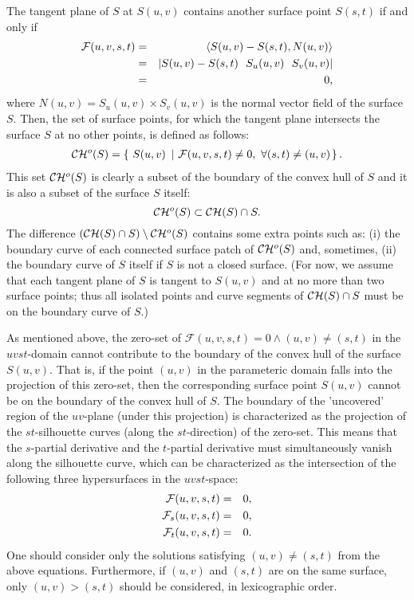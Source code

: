 \documentclass[doublespacing]{elsart}
\begin{document}
The tangent plane of $S$ at $S(u,v)$ contains
another surface point $S(s,t)$ if and only if 
\begin{eqnarray*}
   {\mathcal F}(u,v,s,t) &=& \inner{S(u,v)-S(s,t)}{N(u,v)}\\
   &=& |S(u,v)-S(s,t)\ \ S_u(u,v)\ \ S_v(u,v)|\\
   &=& 0,
\end{eqnarray*}
where $N(u,v) = S_u(u,v) \times S_v(u,v)$ is the normal vector field 
of the surface $S$. Then, the set of surface points, for which 
the tangent plane intersects the surface $S$ at no other points, 
is defined as follows:
\begin{eqnarray*}
\CH{}^o(S) = \left\{~S(u,v)~\left|~ 
{\cal F}(u,v,s,t) \neq 0,~\forall (s,t) \neq (u,v) \right. \right\}.
\end{eqnarray*}
This set $\CH{}^o(S)$ is clearly a subset of the boundary of the convex hull
of $S$ and it is also a subset of the surface $S$ itself:
\begin{equation}
    \CH{}^o(S) \subset \CH{}(S) \cap S.
\label{eqn-cho-ch}
\end{equation}
The difference $(\CH{}(S) \cap S) \setminus \CH{}^o(S)$ contains some extra
points such as: (i) the boundary curve of each connected surface patch of
$\CH{}^o(S)$ and, sometimes, (ii) the boundary curve of $S$ itself if $S$ is 
not a closed surface.  (For now, we assume that each tangent plane of $S$ is
tangent to $S(u,v)$ and at no more than two surface points;
thus all isolated points and curve segments of
$\CH{}(S) \cap S$ must be on the boundary curve of $S$.)

As mentioned above, the zero-set of 
${\mathcal F}(u,v,s,t) = 0 \wedge (u,v) \neq (s,t)$ in
the $uvst$-domain cannot contribute to the boundary of the convex hull
of the surface $S(u,v)$. That is, if the point $(u,v)$ in the parameteric 
domain falls into the projection of this zero-set, then the corresponding
surface point $S(u,v)$ cannot be on the boundary of the convex hull 
of $S$. The boundary of the 'uncovered' region of the $uv$-plane
(under this projection) is characterized as the projection of the 
$st$-silhouette curves (along the $st$-direction) of the zero-set. This means
that the $s$-partial derivative and the $t$-partial derivative must 
simultaneously vanish along the silhouette curve, which can be 
characterized as the
intersection of the following three hypersurfaces in the $uvst$-space:
\begin{eqnarray}
   {\cal F}(u,v,s,t) &=& 0, \label{eqn-f-uvst} \\
   {\cal F}_s(u,v,s,t) &=& 0, \label{eqn-s-partial}\\
   {\cal F}_t(u,v,s,t) &=& 0. \label{eqn-t-partial}
\end{eqnarray}
One should consider only the solutions satisfying $(u,v) \neq (s,t)$
from the above equations. Furthermore, if $(u,v)$ and $(s,t)$ are
on the same surface, only $(u,v) > (s,t)$ should be considered, in
lexicographic order.
\end{document}

